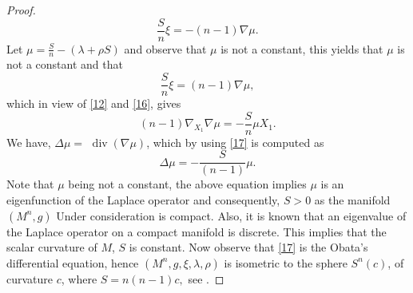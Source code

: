 \documentclass[a4paper, twoside, 10pt]{article}
\numberwithin{equation}{section}
\theoremstyle{definition}
\begin{document}
\begin{proof}
$$
\frac{S}{n} \xi=-(n-1) \nabla \mu.
$$
Let $\mu=\frac{S}{n}-(\lambda+\rho S)$ and observe that $\mu$ is not a constant, this yields that $\mu$ is not a constant and that
$$
\frac{S}{n} \xi=(n-1) \nabla \mu,
$$
which in view of  \eqref{12} and \eqref{16}, gives
\begin{equation}\label{17}
    (n-1) \nabla_{X_1} \nabla \mu=-\frac{S}{n} \mu X_1.
\end{equation}
We have,  $\Delta \mu=$ $\operatorname{div}(\nabla \mu)$, which by using \eqref{17} is computed as
$$
\Delta \mu=-\frac{S}{(n-1)} \mu.
$$
Note that $\mu$ being not a constant, the above equation implies $\mu$ is an eigenfunction of the Laplace operator and consequently, $S>0$ as the manifold $(M^n, g)$
Under consideration is compact. Also, it is known that 
an eigenvalue of the Laplace operator on a compact manifold is discrete.  This implies that the scalar curvature of $M$, $S$ is constant.
Now observe that \eqref{17} is the Obata's differential equation, hence  $(M^n, g, \xi, \lambda,\rho)$ is isometric to the sphere $S^{n}(c)$, of curvature $c$, where $S=n(n-1) c,$ see \cite{obata}.

\smallskip


\end{proof}
\end{document}
